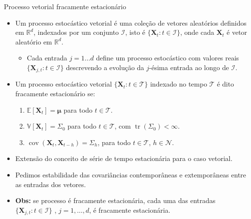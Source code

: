 \documentclass[11pt]{beamer}
\begin{document}
\begin{frame}{Processo vetorial fracamente estacionário}
\begin{itemize}
		\item Um processo estocástico vetorial é uma coleção de vetores aleatórios definidos em $\mathbb{R}^d$, indexados por um conjunto $\mathcal{I}$, isto é $\{\boldsymbol{X}_t: t \in \mathcal{I}\}$, onde cada $\boldsymbol{X}_t$ é vetor aleatório em $\mathbb{R}^d$.
		\begin{itemize}
			\item Cada entrada $j = 1\ldots d$ define um processo estocástico com valores reais $\{\boldsymbol{X}_{j,t}: t \in \mathcal{I}\}$ descrevendo a evolução da $j$-ésima entrada ao longo de $\mathcal{I}$.
		\end{itemize}
	\item Um processo estocástico vetorial $\{\boldsymbol{X}_t: t \in \mathcal{T}\}$ indexado no tempo $ \mathcal{T}$ é dito fracamente estacionário se:
	
	\begin{enumerate}
		\item$ \mathbb{E}[\boldsymbol{X}_t] = \boldsymbol{\mu}$ para todo $t \in \mathcal{T}$.
		\item $ \mathbb{V}[\boldsymbol{X}_t] = \Sigma_0$ para todo $t \in \mathcal{T}$, com $\operatorname{tr}(\Sigma_0) < \infty$.
		\item $\operatorname{cov}(\boldsymbol{X}_t,\boldsymbol{X}_{t-h}) = \Sigma_h$, para todo $t \in \mathcal{T}$, $h \in \mathcal{N}$.
	\end{enumerate}
	\item Extensão do conceito de série de tempo estacionária para o caso vetorial.
	\item Pedimos estabilidade das covariâncias contemporâneas e extemporâneas entre as entradas dos vetores.
	\item \textbf{Obs:} se processo é fracamente estacionária, cada uma das entradas $\{\boldsymbol{X}_{j,t}: t \in \mathcal{I}\}$ , $j =1,\ldots, d$, é fracamente estacionária.
\end{itemize}
\end{frame}
\end{document}
